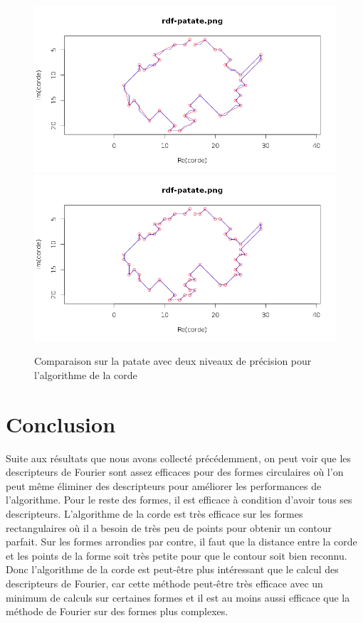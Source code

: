 \documentclass[11pt]{article}
\begin{document}
  
    \begin{figure}[!h]
    \begin{center}
      \includegraphics[width=12cm]{../resultat/comp_patate_impreci.png}
      \includegraphics[width=12cm]{../resultat/comp_patate_preci.png}
      \caption{Comparaison sur la patate avec deux niveaux de précision pour l'algorithme de la corde}
    \end{center}
    \end{figure}
  
  
  \newpage
    
  \section{Conclusion}
  Suite aux résultats que nous avons collecté précédemment, on peut voir que les descripteurs de Fourier sont assez 
  efficaces pour des formes circulaires où l'on peut même éliminer des descripteurs pour améliorer les performances 
  de l'algorithme. Pour le reste des formes, il est efficace à condition d'avoir tous ses descripteurs. L'algorithme 
  de la corde est très efficace sur les formes rectangulaires où il a besoin de très peu de points pour obtenir un 
  contour parfait. Sur les formes arrondies par contre, il faut que la distance entre la corde et les points de la forme 
  soit très petite pour que le contour soit bien reconnu.\\
  
  Donc l'algorithme de la corde est peut-être plus intéressant que le calcul des descripteurs de Fourier, car cette méthode 
  peut-être très efficace avec un minimum de calculs sur certaines formes et il est au moins aussi efficace que la méthode 
  de Fourier sur des formes plus complexes.
  
\end{document}
